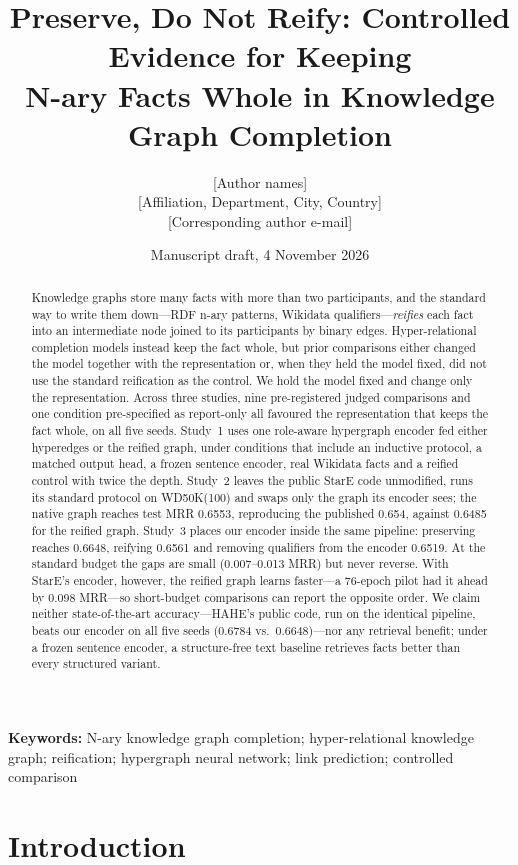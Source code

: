 \documentclass[11pt,a4paper]{article}
\title{Preserve, Do Not Reify: Controlled Evidence for Keeping\\N-ary Facts Whole in Knowledge Graph Completion}
\author{[Author names]\\[2pt]\small [Affiliation, Department, City, Country]\\\small [Corresponding author e-mail]}
\date{Manuscript draft, 4 November 2026}
\begin{document}
\maketitle

\begin{abstract}
Knowledge graphs store many facts with more than two participants, and the standard way to write them down---RDF n-ary patterns, Wikidata qualifiers---\emph{reifies} each fact into an intermediate node joined to its participants by binary edges. Hyper-relational completion models instead keep the fact whole, but prior comparisons either changed the model together with the representation or, when they held the model fixed, did not use the standard reification as the control. We hold the model fixed and change only the representation. Across three studies, nine pre-registered judged comparisons and one condition pre-specified as report-only all favoured the representation that keeps the fact whole, on all five seeds. Study~1 uses one role-aware hypergraph encoder fed either hyperedges or the reified graph, under conditions that include an inductive protocol, a matched output head, a frozen sentence encoder, real Wikidata facts and a reified control with twice the depth. Study~2 leaves the public StarE code unmodified, runs its standard protocol on WD50K(100) and swaps only the graph its encoder sees; the native graph reaches test MRR 0.6553, reproducing the published 0.654, against 0.6485 for the reified graph. Study~3 places our encoder inside the same pipeline: preserving reaches 0.6648, reifying 0.6561 and removing qualifiers from the encoder 0.6519. At the standard budget the gaps are small (0.007--0.013 MRR) but never reverse. With StarE's encoder, however, the reified graph learns faster---a 76-epoch pilot had it ahead by 0.098 MRR---so short-budget comparisons can report the opposite order. We claim neither state-of-the-art accuracy---HAHE's public code, run on the identical pipeline, beats our encoder on all five seeds (0.6784 vs.\ 0.6648)---nor any retrieval benefit; under a frozen sentence encoder, a structure-free text baseline retrieves facts better than every structured variant.
\end{abstract}

\noindent\textbf{Keywords:} N-ary knowledge graph completion; hyper-relational knowledge graph; reification; hypergraph neural network; link prediction; controlled comparison

\section{Introduction}
\end{document}
